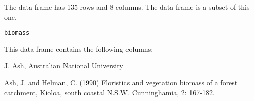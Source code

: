 \begin{Description}\relax
The  data frame has 135 rows and 8 columns.  The
 data frame is a subset of this one.
\end{Description}
\begin{Usage}
\begin{verbatim}biomass\end{verbatim}
\end{Usage}
\begin{Format}\relax
This data frame contains the following columns:
\end{Format}
\begin{Source}\relax
J. Ash, Australian National University
\end{Source}
\begin{References}\relax
Ash, J. and Helman, C. (1990) Floristics and vegetation
biomass of a forest catchment, Kioloa, south coastal N.S.W.
Cunninghamia, 2: 167-182.
\end{References}

